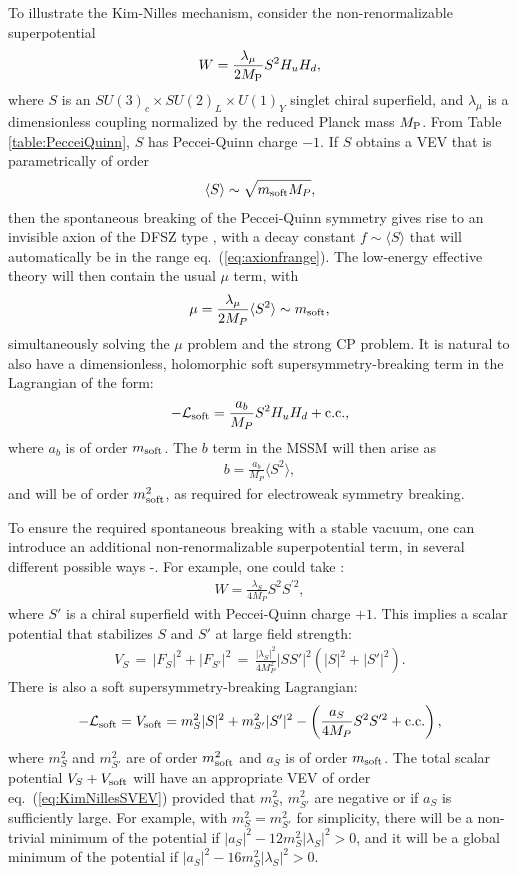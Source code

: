 \documentclass[11pt]{article}
\def\beq{\begin{eqnarray}}
\def\eeq{\end{eqnarray}}
\def\MPlanck{M_{\rm P}}
\begin{document}
To illustrate the Kim-Nilles mechanism, consider 
the non-renormalizable superpotential
\beq
W = \frac{\lambda_\mu}{2\MPlanck} S^2 H_u H_d,
\eeq
where $S$ is an $SU(3)_c \times SU(2)_L \times U(1)_Y$ singlet chiral
superfield, and
$\lambda_\mu$
is a dimensionless coupling normalized by the reduced Planck mass $\MPlanck$. From Table 
\ref{table:PecceiQuinn}, $S$ has Peccei-Quinn charge $-1$.
If $S$ obtains a VEV that is parametrically of order
\beq
\langle S \rangle \sim
\sqrt{m_{\rm soft} M_P},
\label{eq:KimNillesSVEV}
\eeq
then the spontaneous breaking of the
Peccei-Quinn symmetry gives rise to an invisible 
axion of the DFSZ type \cite{DFSZ}, with a decay constant
$f \sim \langle S \rangle$ that will 
automatically be in the range eq.~(\ref{eq:axionfrange}).
The low-energy effective theory will then contain the usual $\mu$ term, with
\beq
\mu = \frac{\lambda_\mu}{2 M_P} \langle S^2 \rangle  \sim m_{\rm soft},
\eeq
simultaneously solving 
the $\mu$ problem and the strong
CP problem. It is natural to also
have a dimensionless, holomorphic soft supersymmetry-breaking term in the
Lagrangian of the form:
\beq
-{\cal L}_{\rm soft} = \frac{a_b}{M_P} S^2 H_u H_d + {\rm c.c.},
\eeq
where $a_b$ is of order $m_{\rm soft}$.
The $b$ term in the MSSM will then arise as \beq
b = \frac{a_b}{M_P} \langle S^2
\rangle,
\eeq
and will be of order $m_{\rm soft}^2$, as required for
electroweak symmetry breaking.

To ensure the required spontaneous breaking with a stable vacuum, 
one can introduce an additional
non-renormalizable superpotential term, in several different possible ways
\cite{MurayamaSuzukiYanagida}-\cite{Martinaxinos}.
For example, one could take \cite{Martinaxinos}:
\beq
W = \frac{\lambda_S}{4 M_{P}} S^2 S^{\prime 2},
\eeq
where $S'$ is a chiral superfield with Peccei-Quinn charge $+1$.
This implies a scalar potential that stabilizes $S$ and $S'$ at
large field strength:
\beq
V_S \,=\, |F_S|^2 + |F_{S'}|^2 \,=\, \frac{|\lambda_S|^2}{4 M_P^2}
|S S'|^2 (|S|^2 + |S'|^2) .
\eeq
There is also a soft supersymmetry-breaking Lagrangian:
\beq
-{\cal L}_{\rm soft} = V_{\rm soft} = m^2_S |S|^2  + m^2_{S'}
|S'|^2 - \left ( \frac{a_S}{4 M_P} S^2 S^{\prime 2}  + {\rm c.c.} \right ),
\eeq
where $m^2_S$ and $m^2_{S'}$ are of order $m_{\rm soft}^2$
and $a_S$ is of order $m_{\rm soft}$. The total scalar potential
$V_S + V_{\rm soft}$
will have
an appropriate VEV of order eq.~(\ref{eq:KimNillesSVEV}) provided that
$m^2_S$, $m^2_{S'}$ are
negative or if $a_S$ is sufficiently large. For example, with $m^2_S =
m^2_{S'}$ for simplicity, there will be a non-trivial minimum of
the potential if $|a_S|^2 - 12 m_S^2 |\lambda_S|^2 > 0$,
and it will be a global minimum of the potential if $|a_S|^2 - 16 m_S^2
|\lambda_S|^2 > 0$.
\end{document}
